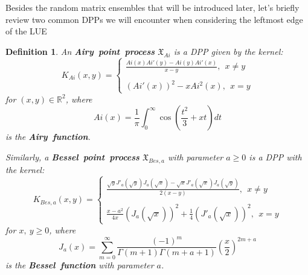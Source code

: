 \documentclass[11pt]{article}
\newtheorem{definition}[theorem]{Definition}
\numberwithin{equation}{section}%
\numberwithin{theorem}{section}
\begin{document}
Besides the random matrix ensembles that will be introduced later, let's briefly review two common DPPs we will encounter when considering the leftmost edge of the LUE
\begin{definition}\label{def4 classic DPPs}
An \textbf{Airy~point~process} $\mathfrak{X}_{Ai}$ is a DPP given by the kernel:
\begin{equation}\label{airy kernel}
    K_{Ai}(x,y)=\left\{\begin{array}{rr}
      \frac{Ai(x)Ai'(y)-Ai(y)Ai'(x)}{x-y},~~x\ne y\\\\
      \left(Ai'(x)\right)^2-xAi^2(x),~~x=y
    \end{array}\right.
\end{equation}
for $(x,y)\in\mathbb{R}^2$, where
\begin{equation*}
    Ai(x)=\frac{1}{\pi}\int_0^\infty\cos\left(\frac{t^2}{3}+xt\right)dt
\end{equation*}
is the \textbf{Airy~function}.

Similarly, a \textbf{Bessel~point~process} $\mathfrak{X}_{Bes,a}$ with parameter $a\ge0$ is a DPP with the kernel:
\begin{equation}\label{bessel kernel}
    K_{Bes,a}(x,y)=\left\{\begin{array}{cc}
    \frac{\sqrt y J'_a(\sqrt y)J_a(\sqrt x)-\sqrt x J'_a(\sqrt x)J_a(\sqrt y)}{2(x-y)},~~x\ne y\\\\
    \frac{x-a^2}{4x}\left(J_a(\sqrt x)\right)^2+\frac{1}{4}\left(J'_a(\sqrt x)\right)^2,~~x=y
    \end{array}\right.
\end{equation}
for $x,~y\ge0$, where
\begin{equation*}
    J_a(x)=\sum_{m=0}^\infty\frac{(-1)^m}{\Gamma(m+1)\Gamma(m+a+1)}\left(\frac{x}{2}\right)^{2m+a}
\end{equation*}
is the \textbf{Bessel~function} with parameter $a$.
\end{definition}
\end{document}
